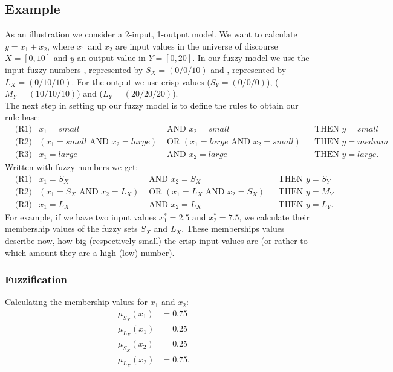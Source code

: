 \subsection*{Example}
As an illustration we consider a 2-input, 1-output model. We want to calculate $y=x_1+x_2$, where $x_1$ and $x_2$ are input values in the universe of discourse $X=[0,10]$ and $y$ an output value in $Y=[0,20]$. In our fuzzy model we use the input fuzzy numbers , represented by $S_X=(0/0/10)$ and , represented by $L_X=(0/10/10)$. For the output we use crisp values  ($S_Y=(0/0/0)$),  ($M_Y=(10/10/10)$) and  ($L_Y=(20/20/20)$).\\
The next step in setting up our fuzzy model is to define the rules to obtain our rule base:
\begin{align*}
&\text{(R1)} & x_1=small &\text{ AND } x_2=small & &\text{THEN } y=small \\
&\text{(R2)} & (x_1=small \text{ AND } x_2=large) &\text{ OR } (x_1=large \text{ AND } x_2=small) & &\text{THEN } y=medium \\
&\text{(R3)} & x_1=large &\text{ AND } x_2=large & &\text{THEN } y=large.
\end{align*}
Written with fuzzy numbers we get:
\begin{align*}
&\text{(R1)} & x_1=S_X &\text{ AND } x_2=S_X & &\text{THEN } y=S_Y \\
&\text{(R2)} & (x_1=S_X \text{ AND } x_2=L_X) &\text{ OR } (x_1=L_X \text{ AND } x_2=S_X) & &\text{THEN } y=M_Y \\
&\text{(R3)} & x_1=L_X &\text{ AND } x_2=L_X & &\text{THEN } y=L_Y.
\end{align*}
For example, if we have two input values $x_1^*=2.5$ and $x_2^*=7.5$, we calculate their membership values of the fuzzy sets $S_X$ and $L_X$. These memberships values describe now, how big (respectively small) the crisp input values are (or rather to which amount they are a high (low) number).

\subsubsection*{Fuzzification}
Calculating the membership values for $x_1$ and $x_2$:
\begin{align*}
\mu_{S_X}(x_1) &= 0.75 & \\
\mu_{L_X}(x_1) &= 0.25 & \\
\mu_{S_X}(x_2) &= 0.25 & \\
\mu_{L_X}(x_2) &= 0.75. &
\end{align*}

